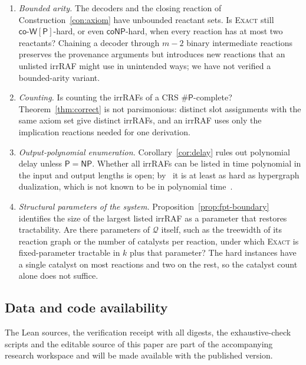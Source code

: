 \documentclass[11pt,a4paper]{article}
\theoremstyle{plain}
\theoremstyle{definition}
\theoremstyle{remark}
\newcommand{\Exact}{\textup{\textsc{Exact}}}
\newcommand{\NP}{\mathsf{NP}}
\newcommand{\coNP}{\mathsf{coNP}}
\newcommand{\Ptime}{\mathsf{P}}
\newcommand{\coWP}{\mathsf{co\text{-}W[P]}}
\newcommand{\cQ}{\mathcal{Q}}
\begin{document}
\begin{enumerate}
\item \emph{Bounded arity.} The decoders and the closing reaction of Construction~\ref{con:axiom} have unbounded reactant sets. Is \Exact{} still $\coWP$-hard, or even $\coNP$-hard, when every reaction has at most two reactants? Chaining a decoder through $m-2$ binary intermediate reactions preserves the provenance arguments but introduces new reactions that an unlisted irrRAF might use in unintended ways; we have not verified a bounded-arity variant.
\item \emph{Counting.} Is counting the irrRAFs of a CRS $\#\Ptime$-complete? Theorem~\ref{thm:correct} is not parsimonious: distinct slot assignments with the same axiom set give distinct irrRAFs, and an irrRAF uses only the implication reactions needed for one derivation.
\item \emph{Output-polynomial enumeration.} Corollary~\ref{cor:delay} rules out polynomial delay unless $\Ptime=\NP$. Whether all irrRAFs can be listed in time polynomial in the input and output lengths is open; by~\cite{minraf2026} it is at least as hard as hypergraph dualization, which is not known to be in polynomial time~\cite{fredman1996complexity}.
\item \emph{Structural parameters of the system.} Proposition~\ref{prop:fpt-boundary} identifies the size of the largest listed irrRAF as a parameter that restores tractability. Are there parameters of $\cQ$ itself, such as the treewidth of its reaction graph or the number of catalysts per reaction, under which \Exact{} is fixed-parameter tractable in $k$ plus that parameter? The hard instances have a single catalyst on most reactions and two on the rest, so the catalyst count alone does not suffice.
\end{enumerate}

\subsection*{Data and code availability}

The Lean sources, the verification receipt with all digests, the exhaustive-check scripts and the editable source of this paper are part of the accompanying research workspace and will be made available with the published version.



\end{document}
